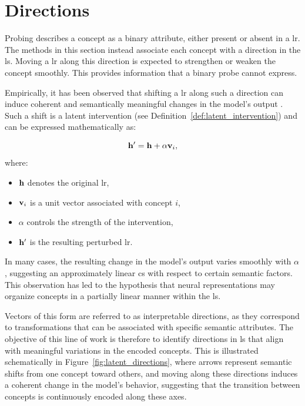 \section{Directions}
\label{sec:latent_space_analysis_directions}

Probing describes a concept as a binary attribute, either present or absent in a \gls{lr}.
The methods in this section instead associate each concept with a direction in the \gls{ls}.
Moving a \gls{lr} along this direction is expected to strengthen or weaken the concept smoothly.
This provides information that a binary probe cannot express.

Empirically, it has been observed that shifting a \gls{lr} along such a direction can induce coherent and semantically meaningful changes in the model's output \parencite{haas2024discovering, voynov2020unsuperviseddiscoveryinterpretabledirections}.
Such a shift is a latent intervention (see Definition~\ref{def:latent_intervention}) and can be expressed mathematically as:
\begin{equationwhere}
\[
\latentRepresentation' = \latentRepresentation + \alpha \vect{v}_i,
\]
where:
\begin{itemize}
    \item $\latentRepresentation$ denotes the original \gls{lr},
    \item $\mathbf{v}_i$ is a unit vector associated with concept $i$,
    \item $\alpha$ controls the strength of the intervention,
    \item $\latentRepresentation'$ is the resulting perturbed \gls{lr}.
\end{itemize}
\end{equationwhere}

In many cases, the resulting change in the model's output varies smoothly with \(\alpha\), suggesting an approximately linear \gls{cs} with respect to certain semantic factors.
This observation has led to the hypothesis that neural representations may organize concepts in a partially linear manner within the \gls{ls}.

Vectors of this form are referred to as interpretable directions, as they correspond to transformations that can be associated with specific semantic attributes.
The objective of this line of work is therefore to identify directions in \gls{ls} that align with meaningful variations in the encoded concepts.
This is illustrated schematically in Figure~\ref{fig:latent_directions}, where arrows represent semantic shifts from one concept toward others, and moving along these directions induces a coherent change in the model's behavior, suggesting that the transition between concepts is continuously encoded along these axes.

